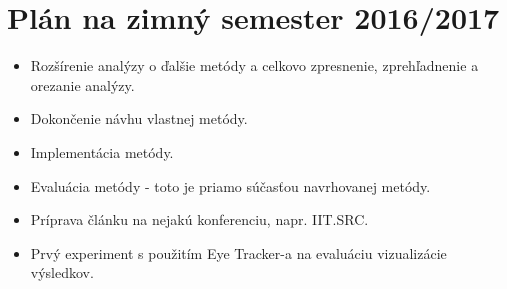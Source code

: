 \section{Plán na zimný semester 2016/2017}\label{plan-zima}
\begin{itemize}
	\item Rozšírenie analýzy o ďalšie metódy a celkovo zpresnenie, zprehľadnenie a orezanie analýzy.
	\item Dokončenie návhu vlastnej metódy.
	\item Implementácia metódy.
	\item Evaluácia metódy - toto je priamo súčasťou navrhovanej metódy.
	\item Príprava článku na nejakú konferenciu, napr. IIT.SRC.
	\item Prvý experiment s použitím Eye Tracker-a na evaluáciu vizualizácie výsledkov.
\end{itemize}

